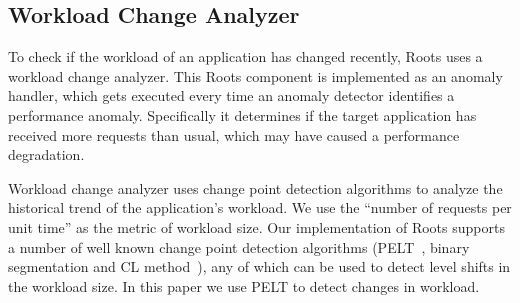 
\subsection{Workload Change Analyzer}

To check if the workload of an application has changed recently, Roots uses a workload change analyzer.
This Roots component  is implemented as an anomaly handler, which gets executed every time an 
anomaly detector
identifies a performance anomaly. 
Specifically it determines if the target application has received more requests than usual, which
may have caused a performance degradation.

Workload change analyzer uses change point detection algorithms to analyze the historical trend of 
the application's workload. We use the ``number of requests
per unit time'' as the metric of workload size. 
Our implementation of Roots supports a number of well known change point
detection algorithms (PELT~\cite{doi:10.1080/01621459.2012.737745}, binary segmentation 
and CL method~\cite{chen1993joint}), any of which can be used to detect level shifts in the
workload size.  In this paper we use PELT to detect changes in workload.

